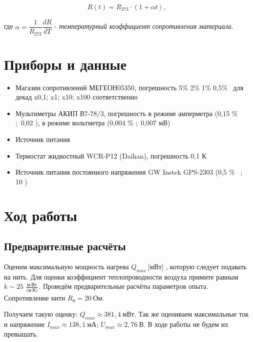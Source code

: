 \documentclass[a4paper,12pt]{article}
\begin{document}
        \begin{align}
            R(t) = R_{273} \cdot (1 + \alpha t) \label{RT},
        \end{align}

        где $\alpha = \dfrac{1}{R_{273}} \dfrac{dR}{dT}$ - \textit{температурный коэффициент сопротивления материала}.


    \section{Приборы и данные}
    \begin{itemize}
    \item Магазин сопротивлений МЕГЕОН05350, погрешность  5\% 2\% 1\% 0,5\% \ для декад x0,1; x1; x10; x100 соответственно
    \item Мультиметры  АКИП В7-78/3, погрешность в режиме амперметра (0,15 \% ;\ 0,02 ), в режиме вольтметра (0,004 \% ;\ 0,007 мВ)
    \item Источник питания
    \item Термостат жидкостный WCR-P12 (Daihan), погрешность 0,1 К
    \item Источник питания постоянного напряжения GW Instek GPS-2303 (0,5 \% \ ; 10 )
    \end{itemize}

    \section{Ход работы}
    \subsection{Предварителные расчёты}
    Оценим максимальную мощность нагрева $Q_{max} \ \text{[мВт]}$ , которую следует подавать на нить. Для оценки коэффициент теплопроводности воздуха примите равным $k \sim 25 \ \frac{\text{м} \cdot \text{Вт}}{\text{(м} \cdot \text{К)}}$. 
    Проведём предварительные расчёты параметров опыта. Сопротивление нити $R_{\text{н}} = 20 \ \text{Ом}$. 
    
     Получаем такую оценку: $Q_{max} \approx 381,4\ \text{мВт}$. Так же оцениваем максимальные ток и напряжение $I_{max} \approx 138,1 \ \text{мА}$; $U_{max} \approx 2,76 \ \text{В}$. В ходе работы не будем их превышать.
\end{document}
